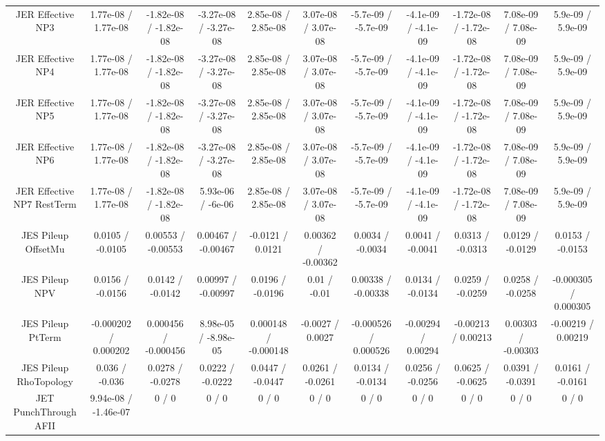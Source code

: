\begin{table}[htbp]
\begin{center}
\begin{tabular}{|c|c|c|c|c|c|c|c|c|c|c|}
  JER Effective NP3 & 1.77e-08 / 1.77e-08 & -1.82e-08 / -1.82e-08 & -3.27e-08 / -3.27e-08 & 2.85e-08 / 2.85e-08 & 3.07e-08 / 3.07e-08 & -5.7e-09 / -5.7e-09 & -4.1e-09 / -4.1e-09 & -1.72e-08 / -1.72e-08 & 7.08e-09 / 7.08e-09 & 5.9e-09 / 5.9e-09 \\ 
  JER Effective NP4 & 1.77e-08 / 1.77e-08 & -1.82e-08 / -1.82e-08 & -3.27e-08 / -3.27e-08 & 2.85e-08 / 2.85e-08 & 3.07e-08 / 3.07e-08 & -5.7e-09 / -5.7e-09 & -4.1e-09 / -4.1e-09 & -1.72e-08 / -1.72e-08 & 7.08e-09 / 7.08e-09 & 5.9e-09 / 5.9e-09 \\ 
  JER Effective NP5 & 1.77e-08 / 1.77e-08 & -1.82e-08 / -1.82e-08 & -3.27e-08 / -3.27e-08 & 2.85e-08 / 2.85e-08 & 3.07e-08 / 3.07e-08 & -5.7e-09 / -5.7e-09 & -4.1e-09 / -4.1e-09 & -1.72e-08 / -1.72e-08 & 7.08e-09 / 7.08e-09 & 5.9e-09 / 5.9e-09 \\ 
  JER Effective NP6 & 1.77e-08 / 1.77e-08 & -1.82e-08 / -1.82e-08 & -3.27e-08 / -3.27e-08 & 2.85e-08 / 2.85e-08 & 3.07e-08 / 3.07e-08 & -5.7e-09 / -5.7e-09 & -4.1e-09 / -4.1e-09 & -1.72e-08 / -1.72e-08 & 7.08e-09 / 7.08e-09 & 5.9e-09 / 5.9e-09 \\ 
  JER Effective NP7 RestTerm & 1.77e-08 / 1.77e-08 & -1.82e-08 / -1.82e-08 & 5.93e-06 / -6e-06 & 2.85e-08 / 2.85e-08 & 3.07e-08 / 3.07e-08 & -5.7e-09 / -5.7e-09 & -4.1e-09 / -4.1e-09 & -1.72e-08 / -1.72e-08 & 7.08e-09 / 7.08e-09 & 5.9e-09 / 5.9e-09 \\ 
  JES Pileup OffsetMu & 0.0105 / -0.0105 & 0.00553 / -0.00553 & 0.00467 / -0.00467 & -0.0121 / 0.0121 & 0.00362 / -0.00362 & 0.0034 / -0.0034 & 0.0041 / -0.0041 & 0.0313 / -0.0313 & 0.0129 / -0.0129 & 0.0153 / -0.0153 \\ 
  JES Pileup NPV & 0.0156 / -0.0156 & 0.0142 / -0.0142 & 0.00997 / -0.00997 & 0.0196 / -0.0196 & 0.01 / -0.01 & 0.00338 / -0.00338 & 0.0134 / -0.0134 & 0.0259 / -0.0259 & 0.0258 / -0.0258 & -0.000305 / 0.000305 \\ 
  JES Pileup PtTerm & -0.000202 / 0.000202 & 0.000456 / -0.000456 & 8.98e-05 / -8.98e-05 & 0.000148 / -0.000148 & -0.0027 / 0.0027 & -0.000526 / 0.000526 & -0.00294 / 0.00294 & -0.00213 / 0.00213 & 0.00303 / -0.00303 & -0.00219 / 0.00219 \\ 
  JES Pileup RhoTopology & 0.036 / -0.036 & 0.0278 / -0.0278 & 0.0222 / -0.0222 & 0.0447 / -0.0447 & 0.0261 / -0.0261 & 0.0134 / -0.0134 & 0.0256 / -0.0256 & 0.0625 / -0.0625 & 0.0391 / -0.0391 & 0.0161 / -0.0161 \\ 
  JET PunchThrough AFII & 9.94e-08 / -1.46e-07 & 0 / 0 & 0 / 0 & 0 / 0 & 0 / 0 & 0 / 0 & 0 / 0 & 0 / 0 & 0 / 0 & 0 / 0 \\ 

\end{tabular}
\end{center}
\end{table}
